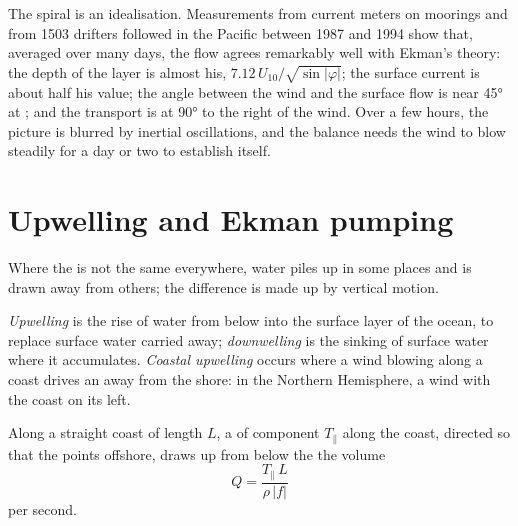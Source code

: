 The spiral is an idealisation. Measurements from current meters on moorings and
from 1503 drifters followed in the Pacific between 1987 and 1994 show that, averaged
over many days, the flow agrees remarkably well with Ekman's theory: the depth of the
layer is almost his, $7.12\,U_{10}/\sqrt{\sin|\varphi|}$; the surface current is
about half his value; the angle between the wind and the surface flow is near
\ang{45} at ; and the transport is at \ang{90} to the right of the wind.
Over a few hours, the picture is blurred by inertial oscillations, and the balance
needs the wind to blow steadily for a day or two to establish itself.

\section{Upwelling and Ekman pumping}\label{sec:b1:ocean-circulation:upwelling}

Where the  is not the same everywhere, water piles up in some places
and is drawn away from others; the difference is made up by vertical motion.

\begin{definition}\label{def:b1:ocean-circulation:upwelling}
\emph{Upwelling} is the rise of water from below into the surface
layer of the ocean, to replace surface water carried away; \emph{downwelling}%
 is the sinking of surface water where it accumulates.
\emph{Coastal upwelling} occurs where a wind blowing along
a coast drives an  away from the shore: in the Northern Hemisphere,
a wind with the coast on its left.
\end{definition}

\begin{proposition}\label{prop:b1:ocean-circulation:coastal}
Along a straight coast of length $L$, a  of component $T_\parallel$
along the coast, directed so that the  points offshore, draws up
from below the  the volume
\[
  Q = \frac{T_\parallel\,L}{\rho\,|f|}
\]
per second.
\end{proposition}

